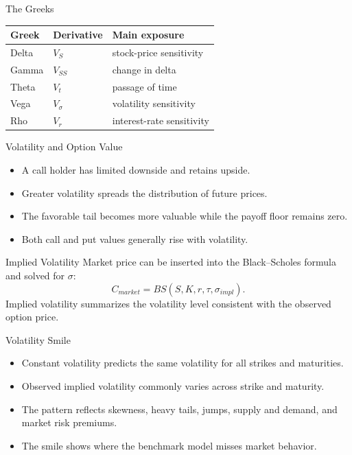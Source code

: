\documentclass[aspectratio=169]{beamer}
\begin{document}
\begin{frame}[t]{The Greeks}
\justifying
\begin{center}
\begin{tabular}{lll}\toprule
Greek&Derivative&Main exposure\\\midrule
Delta&$V_S$&stock-price sensitivity\\
Gamma&$V_{SS}$&change in delta\\
Theta&$V_t$&passage of time\\
Vega&$V_\sigma$&volatility sensitivity\\
Rho&$V_r$&interest-rate sensitivity\\\bottomrule
\end{tabular}
\end{center}
\end{frame}

\begin{frame}[t]{Volatility and Option Value}
\justifying
\begin{itemize}
\item A call holder has limited downside and retains upside.
\item Greater volatility spreads the distribution of future prices.
\item The favorable tail becomes more valuable while the payoff floor remains zero.
\item Both call and put values generally rise with volatility.
\end{itemize}
\end{frame}

\begin{frame}[t]{Implied Volatility}
\justifying
Market price can be inserted into the Black--Scholes formula and solved for $\sigma$:
\[C_{market}=BS(S,K,r,\tau,\sigma_{impl}).\]
Implied volatility summarizes the volatility level consistent with the observed option price.
\end{frame}

\begin{frame}[t]{Volatility Smile}
\justifying
\begin{itemize}
\item Constant volatility predicts the same volatility for all strikes and maturities.
\item Observed implied volatility commonly varies across strike and maturity.
\item The pattern reflects skewness, heavy tails, jumps, supply and demand, and market risk premiums.
\item The smile shows where the benchmark model misses market behavior.
\end{itemize}
\end{frame}
\end{document}
